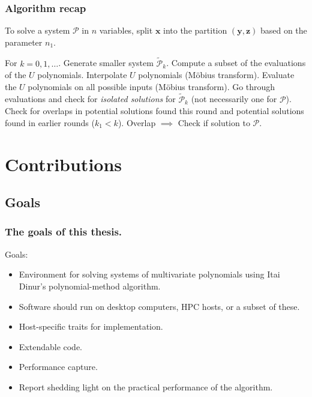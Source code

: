 \documentclass{beamer}
\begin{document}
\begin{frame}
    \frametitle{Algorithm recap}
    To solve a system $\mathcal{P}$ in $n$ variables, split $\mathbf{x}$ into the partition $(\mathbf{y}, \mathbf{z})$ based on the parameter $n_1$.

    \begin{outline}
         For $k = 0, 1, \dots$.
             Generate smaller system $\tilde{\mathcal{P}}_k$.
             Compute a subset of the evaluations of the $U$ polynomials.
             Interpolate $U$ polynomials (Möbius transform).
             Evaluate the $U$ polynomials on all possible inputs (Möbius transform).
             Go through evaluations and check for \textit{isolated solutions} for $\tilde{\mathcal{P}}_k$ (not necessarily one for $\mathcal{P}$).
             Check for overlaps in potential solutions found this round and potential solutions found in earlier rounds ($k_1 < k$).
                 Overlap $\implies$ Check if solution to $\mathcal{P}$.
    \end{outline}
\end{frame}

\section{Contributions}

\subsection{Goals}
\begin{frame}
    \frametitle{The goals of this thesis.}
    Goals:
    \begin{itemize}
        \item Environment for solving systems of multivariate polynomials using Itai Dinur's polynomial-method algorithm.
        \item Software should run on desktop computers, HPC hosts, or a subset of these.
        \item Host-specific traits for implementation.
        \item Extendable code.
        \item Performance capture.
        \item Report shedding light on the practical performance of the algorithm.
    \end{itemize}
\end{frame}
\end{document}
